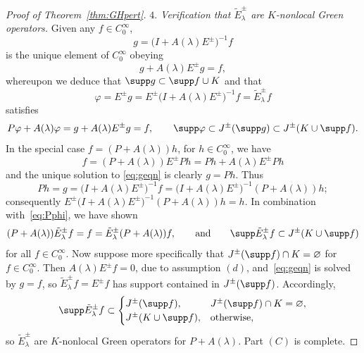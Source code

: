 \begin{proof}[Proof of Theorem~\ref{thm:GHpert}]
 	\emph{$4.$ Verification that $\tilde{E}^\pm_\lambda$ are $K$-nonlocal Green operators.}
 	Given any $f\in C_0^\infty$,
 	\begin{equation*}
 		g=\big(I+ A(\lambda)E^\pm\big)^{-1} f
 	\end{equation*}
 	is the unique element of $C_0^\infty$ obeying
 	\begin{equation}\label{eq:geqn}
 		g + A(\lambda) E^\pm g= f,
 	\end{equation}
 	whereupon we deduce that $\supp g\subset \supp f \cup K$ and that
 	\begin{equation*}
 		\varphi = E^\pm g = E^\pm \big(I+ A(\lambda)E^\pm\big)^{-1} f = \tilde{E}^\pm_\lambda f
 	\end{equation*}
 	satisfies
 	\begin{equation}\label{eq:Pphi}
 		P\varphi + A(\lambda)\varphi = g+A(\lambda)E^\pm g=f, \qquad \supp \varphi\subset J^\pm(\supp g) \subset J^\pm(K\cup \supp f).
 	\end{equation}
 	In the special case $f=(P+A(\lambda))h$, for $h\in C_0^\infty$,
 	we have
 	\begin{equation*}
 		f = (P+ A(\lambda))E^\pm P h=Ph + A(\lambda) E^\pm Ph
 	\end{equation*}
 	and the unique solution to \eqref{eq:geqn} is clearly $g=Ph$. Thus
 	\begin{equation*}
 		Ph=g=\big(I+ A(\lambda)E^\pm\big)^{-1}f =\big(I+ A(\lambda)E^\pm\big)^{-1}(P+ A(\lambda))h;
 	\end{equation*}
 	consequently $E^\pm \big(I+ A(\lambda)E^\pm\big)^{-1} (P+ A(\lambda))h = h$.
 	In combination with~\eqref{eq:Pphi}, we have shown
 	\begin{equation*}
 		(P+ A(\lambda))\tilde{E}^\pm_\lambda f=f = \tilde{E}^\pm_\lambda (P+ A(\lambda)) f,\qquad\text{and}\qquad
 		\supp\tilde{E}^\pm_\lambda f\subset J^\pm(K\cup \supp f)
 	\end{equation*}
 	for all $f\in C_0^\infty$.
 	Now suppose more specifically that $J^\pm(\supp f)\cap K=\varnothing$ for $f\in C^\infty_0$. Then $A(\lambda)E^\pm f=0$, due to assumption $(d)$, and~\eqref{eq:geqn} is solved by $g=f$, so
 	$\tilde{E}^\pm_\lambda f=E^\pm f$ has support contained in $J^\pm(\supp f)$. Accordingly,
 	\begin{equation*}
 		\supp\tilde{E}^\pm_\lambda f\subset
 		\begin{cases}
 			J^\pm(\supp f), & J^\pm(\supp f)\cap K=\varnothing ,\\
 			J^\pm(K\cup \supp f), & \text{otherwise,}
 		\end{cases}
 	\end{equation*}
 	so $\tilde{E}^\pm_\lambda$ are $K$-nonlocal Green operators for $P+ A(\lambda)$. Part $(C)$ is complete.
 	

\end{proof}
